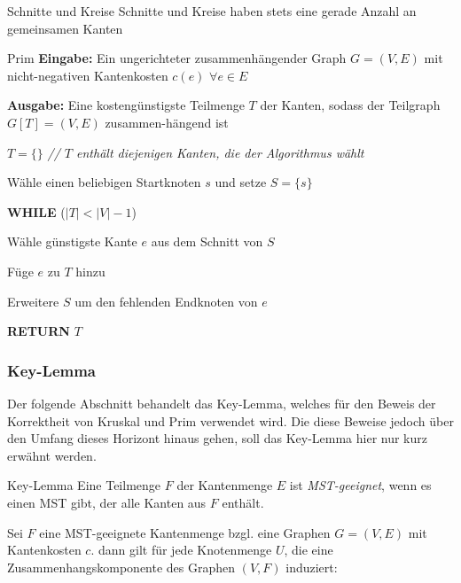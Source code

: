 \documentclass{panikzettel}
\newcommand\tab[1][1cm]{\hspace*{#1}}
\newcommand{\boxspace}{	\vspace{-\baselineskip}	}
\begin{document}
{\begin{halfboxl}
\end{halfboxl}%
\begin{halfboxr}
	\boxspace
	
	\begin{theo}{Schnitte und Kreise}
		Schnitte und Kreise haben stets eine gerade Anzahl an gemeinsamen Kanten
	\end{theo}
\end{halfboxr}


\begin{algo}{Prim}
	\textbf{Eingabe:} Ein ungerichteter zusammenhängender Graph $G = (V,E)$ mit nicht-negativen Kantenkosten $c(e)$ $\forall e \in E$
	
	\textbf{Ausgabe:} Eine kostengünstigste Teilmenge $T$ der Kanten, sodass der Teilgraph $G[T] = (V,E)$ zusammen-hängend ist
	
	\tcblower
	
	$T = \{ \}$ \textit{ \color{gray} // $T$ enthält diejenigen Kanten, die der Algorithmus wählt }
	
	Wähle einen beliebigen Startknoten $s$ und setze $S = \{s\}$
	
	\textbf{WHILE} ($|T| < |V| - 1$)
	
	\tab Wähle günstigste Kante $e$ aus dem Schnitt von $S$

	\tab Füge $e$ zu $T$ hinzu
	
	\tab Erweitere $S$ um den fehlenden Endknoten von $e$
	
	\textbf{RETURN} $T$
\end{algo}

\subsubsection{Key-Lemma}

Der folgende Abschnitt behandelt das Key-Lemma, welches für den Beweis der Korrektheit von Kruskal und Prim verwendet wird. Die diese Beweise jedoch über den Umfang dieses Horizont hinaus gehen, soll das Key-Lemma hier nur kurz erwähnt werden.

\begin{defi}{Key-Lemma}
	Eine Teilmenge $F$ der Kantenmenge $E$ ist \emph{MST-geeignet}, wenn es einen MST gibt, der alle Kanten aus $F$ enthält. 
	
	Sei $F$ eine MST-geeignete Kantenmenge bzgl. eine Graphen $G = (V,E)$ mit Kantenkosten $c$. dann gilt für jede Knotenmenge $U$, die eine Zusammenhangskomponente des Graphen $(V,F)$ induziert:
	

\end{defi}}
\end{document}
